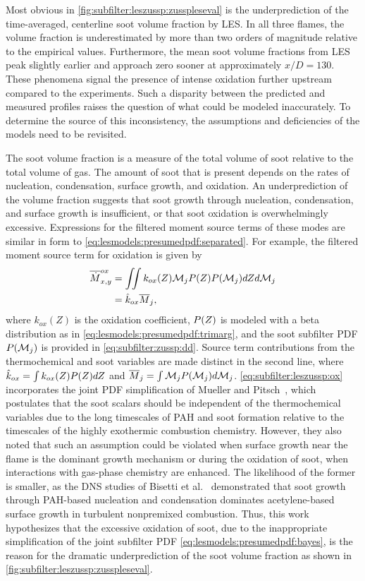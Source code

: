 Most obvious in \cref{fig:subfilter:leszussp:zusspleseval} is the underprediction of the time-averaged, centerline soot volume fraction by LES. In all three flames, the volume fraction is underestimated by more than two orders of magnitude relative to the empirical values. Furthermore, the mean soot volume fractions from LES peak slightly earlier and approach zero sooner at approximately $x/D = 130$. These phenomena signal the presence of intense oxidation further upstream compared to the experiments. Such a disparity between the predicted and measured profiles raises the question of what could be modeled inaccurately. To determine the source of this inconsistency, the assumptions and deficiencies of the models need to be revisited.

The soot volume fraction is a measure of the total volume of soot relative to the total volume of gas. The amount of soot that is present depends on the rates of nucleation, condensation, surface growth, and oxidation. An underprediction of the volume fraction suggests that soot growth through nucleation, condensation, and surface growth is insufficient, or that soot oxidation is overwhelmingly excessive. Expressions for the filtered moment source terms of these modes are similar in form to \cref{eq:lesmodels:presumedpdf:separated}. For example, the filtered moment source term for oxidation is given by
\begin{equation}\label{eq:subfilter:leszussp:ox}
  \begin{split}
    \overline{\dot{M}}_{x,y}^{ox} &= \iint k_{ox}(Z)\mathcal{M}_jP(Z) P(\mathcal{M}_j) dZ d\mathcal{M}_j \\
    &= \hat{k}_{ox}\overline{M}_j,
  \end{split}
\end{equation}
where $k_{ox}(Z)$ is the oxidation coefficient, $P(Z)$ is modeled with a beta distribution as in \cref{eq:lesmodels:presumedpdf:trimarg}, and the soot subfilter PDF $P(\mathcal{M}_j)$ is provided in \cref{eq:subfilter:zussp:dd}. Source term contributions from the thermochemical and soot variables are made distinct in the second line, where $\hat{k}_{ox} = \int k_{ox}(Z)P(Z) dZ$ and $\overline{M}_j = \int \mathcal{M}_j P(\mathcal{M}_j)d\mathcal{M}_j$. \cref{eq:subfilter:leszussp:ox} incorporates the joint PDF simplification of Mueller and Pitsch~\cite{subfilterpdf2011}, which postulates that the soot scalars should be independent of the thermochemical variables due to the long timescales of PAH and soot formation relative to the timescales of the highly exothermic combustion chemistry. However, they also noted that such an assumption could be violated when surface growth near the flame is the dominant growth mechanism or during the oxidation of soot, when interactions with gas-phase chemistry are enhanced. The likelihood of the former is smaller, as the DNS studies of Bisetti et al.~\cite{bisetti2012} demonstrated that soot growth through PAH-based nucleation and condensation dominates acetylene-based surface growth in turbulent nonpremixed combustion. Thus, this work hypothesizes that the excessive oxidation of soot, due to the inappropriate simplification of the joint subfilter PDF \cref{eq:lesmodels:presumedpdf:bayes}, is the reason for the dramatic underprediction of the soot volume fraction as shown in \cref{fig:subfilter:leszussp:zusspleseval}.

